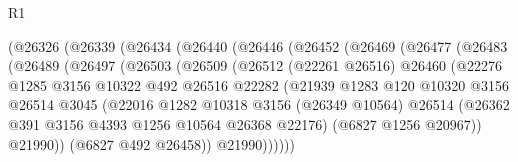 \begin{lexlean}{R1}
\begin{coremodule}
                    (@26326
                      (@26339
                        (@26434
                          (@26440
                            (@26446
                              (@26452
                                (@26469
                                  (@26477
                                    (@26483
                                      (@26489
                                        (@26497
                                          (@26503
                                            (@26509
                                              (@26512
                                                (@22261 @26516)
                                                @26460
                                                (@22276
                                                  @1285
                                                  @3156
                                                  @10322
                                                  @492
                                                  @26516
                                                  @22282
                                                  (@21939
                                                    @1283
                                                    @120
                                                    @10320
                                                    @3156
                                                    @26514
                                                    @3045
                                                    (@22016
                                                      @1282
                                                      @10318
                                                      @3156
                                                      (@26349 @10564)
                                                      @26514
                                                      (@26362
                                                        @391
                                                        @3156
                                                        @4393
                                                        @1256
                                                        @10564
                                                        @26368
                                                        @22176)
                                                      (@6827 @1256 @20967))
                                                    @21990))
                                                (@6827 @492 @26458))
                                              @21990))))))

\end{coremodule}
\end{lexlean}
